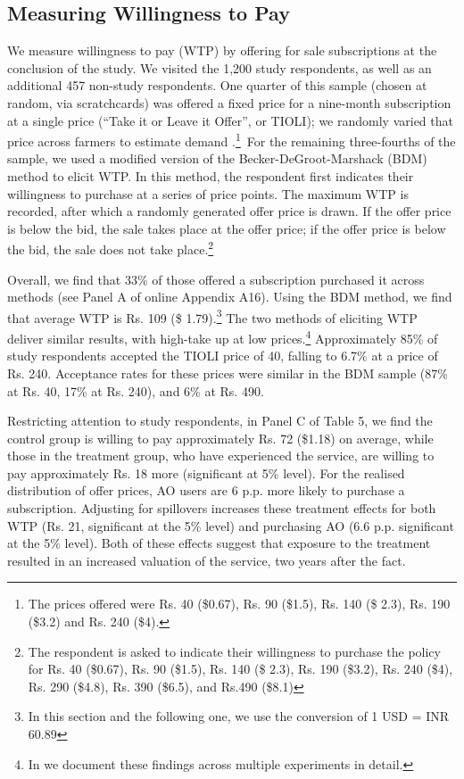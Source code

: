 \documentclass[12pt]{article}
\begin{document}
\subsection{Measuring Willingness to Pay} 

We measure willingness to pay (WTP) by offering for sale subscriptions at the conclusion of the study. We visited the 1,200 study respondents, as well as an additional 457 non-study respondents. One quarter of this sample (chosen at random, via scratchcards) was offered a fixed price for a nine-month subscription at a single price (“Take it or Leave it Offer”, or TIOLI); we randomly varied that price across farmers to estimate demand .\footnote{%
The prices offered were Rs. 40 (\$0.67), Rs. 90 (\$1.5), Rs. 140 (\$ 2.3),
Rs. 190 (\$3.2) and Rs. 240 (\$4).}\  For the remaining three-fourths of the sample, we used a modified version of the Becker-DeGroot-Marshack (BDM) method to elicit WTP. In this method, the respondent first indicates their willingness to purchase at a series of price points. The maximum WTP is recorded, after which a randomly generated offer price is drawn. If the offer price is below the bid, the sale takes place at the offer price; if the offer price is below the bid, the sale does not take place.\footnote{The respondent is asked to indicate their willingness to purchase the policy
for Rs. 40 (\$0.67), Rs. 90 (\$1.5), Rs. 140 (\$ 2.3), Rs. 190 (\$3.2), Rs.
240 (\$4), Rs. 290 (\$4.8), Rs. 390 (\$6.5), and Rs.490 (\$8.1)}

Overall, we find that 33\% of those offered a subscription purchased it across methods (see Panel A of online Appendix A16). Using the BDM method, we find that average WTP is Rs. 109 (\$ 1.79).\footnote{In this section and the following one, we use the conversion of 1 USD = INR 60.89} The two methods of eliciting WTP deliver similar results, with high-take up at low prices.\footnote{In \citet{cole2015elicitation} we document these findings across multiple experiments in detail.} Approximately 85\% of study respondents accepted the TIOLI price of 40, falling to 6.7\% at a price of Rs. 240. Acceptance rates for these prices were similar in the BDM sample (87\% at Rs. 40, 17\% at Rs. 240), and 6\% at Rs. 490. 

Restricting attention to study respondents, in Panel C of Table 5, we find the control group is willing to pay approximately Rs. 72 (\$1.18) on average, while those in the treatment group, who have experienced the service, are willing to pay approximately Rs. 18 more (significant at 5\% level). For the realised distribution of offer prices, AO users are 6 p.p. more likely to purchase a subscription. Adjusting for spillovers increases these treatment effects for both WTP (Rs. 21, significant at the 5\% level) and purchasing AO (6.6 p.p. significant at the 5\% level). Both of these effects suggest that exposure to the treatment resulted in an increased valuation of the service, two years after the fact.  
\end{document}
